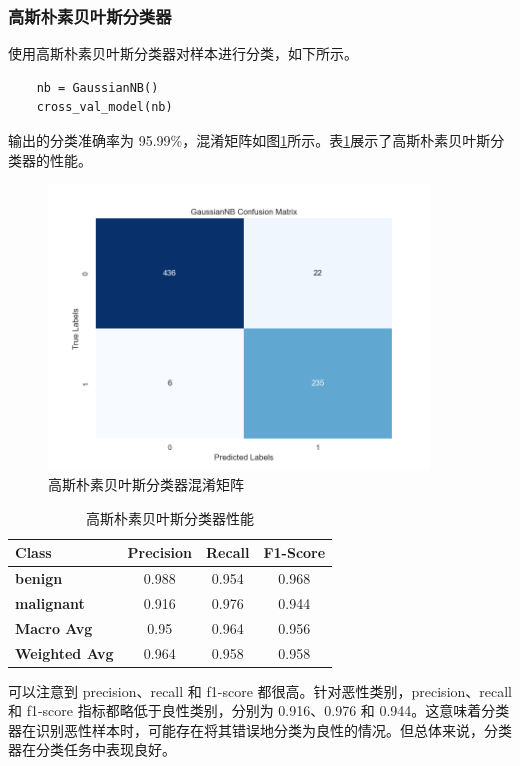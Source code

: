 \documentclass[a4paper,12pt,onecolumn,oneside]{article}
\begin{document}
\subsubsection{高斯朴素贝叶斯分类器}
使用高斯朴素贝叶斯分类器对样本进行分类，如下所示。
\lstset{language=Python}
\lstset{frame=lines}
\lstset{basicstyle=\footnotesize}
\begin{lstlisting}
	nb = GaussianNB()
	cross_val_model(nb)
\end{lstlisting}
输出的分类准确率为 95.99\%，混淆矩阵如图\ref{fig:gaussnb}所示。表\ref{tbl:gaussnb}展示了高斯朴素贝叶斯分类器的性能。\par 
\begin{figure}[h]
	\centering
	\includegraphics[width=0.9\textwidth]{res3/gaussiannb.png}
	\caption{高斯朴素贝叶斯分类器混淆矩阵}
	\label{fig:gaussnb}
\end{figure}
\begin{table}[H]
	\centering
	\begin{tabular}{lccc}
		\toprule
		\textbf{Class} & \textbf{Precision} & \textbf{Recall} & \textbf{F1-Score} \\
		\midrule
		\textbf{benign} & 0.988 & 0.954 & 0.968 \\
		\textbf{malignant} & 0.916 & 0.976 & 0.944 \\
		\midrule
		\textbf{Macro Avg} & 0.95 & 0.964 & 0.956 \\
		\textbf{Weighted Avg} & 0.964 & 0.958 & 0.958 \\
		\bottomrule
	\end{tabular}
	\caption{高斯朴素贝叶斯分类器性能}
	\label{tbl:gaussnb}
\end{table}
可以注意到 precision、recall 和 f1-score 都很高。针对恶性类别，precision、recall 和 f1-score 指标都略低于良性类别，分别为 0.916、0.976 和 0.944。这意味着分类器在识别恶性样本时，可能存在将其错误地分类为良性的情况。但总体来说，分类器在分类任务中表现良好。
\end{document}
